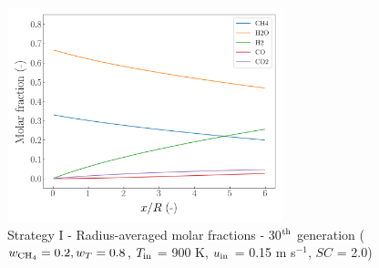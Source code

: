 \documentclass[preprint,12pt]{elsarticle}
\begin{document}
%

\begin{figure}[h!]
\centering
\includegraphics[width=80mm]{results/5/20C_80T/GEN30-AVG.png}
\caption{\label{fig:5R2080G30-avg} Strategy I - Radius-averaged molar fractions -  30$^{\rm{th}}$ generation ($w_{\rm{CH_4}} = 0.2, w_T = 0.8$, $T_{\rm{in}}$ = 900 K, $u_{\rm{in}}$ = 0.15 m s$^{-1}$, $SC$ = 2.0)}
\end{figure}
\end{document}
